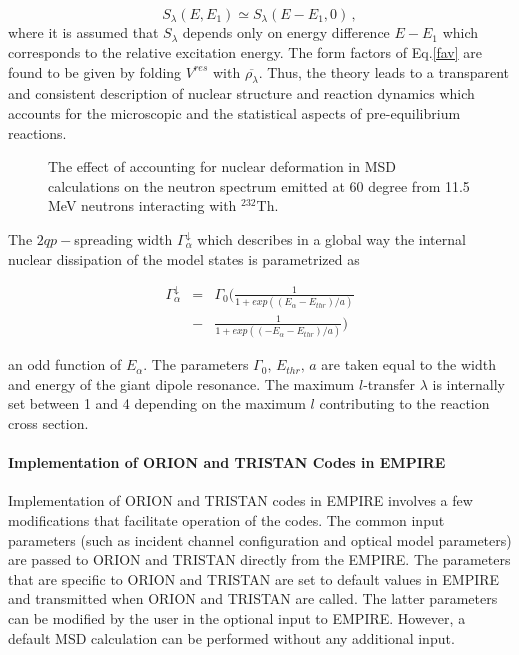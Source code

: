 \documentclass[twocolumn,amsmath,amssymb,10pt,groupedaddress,a4paper]{revtex4}
\begin{document}
\begin{equation}
S_{\lambda}(E,E_{1})\simeq S_{\lambda}(E-E_{1},0)\,,\label{slrpa}
\end{equation}
\noindent where it is assumed that $S_{\lambda}$ depends only on energy difference
$E-E_{1}$ which corresponds to the relative excitation energy. The
form factors of Eq.\ref{fav} are found to be given by folding $V^{res}$
with $\overline{\rho_{\lambda}}$. Thus, the theory leads to a transparent
and consistent description of nuclear structure and reaction dynamics
which accounts for the microscopic and the statistical aspects of
pre-equilibrium reactions.


\begin{figure}[htbp]
\caption{The effect of accounting for nuclear deformation in MSD calculations on the neutron spectrum emitted at 60 degree from 11.5 MeV neutrons interacting with $^{232}$Th.}
\label{fig:Th-defMSD}
\end{figure}


The $2qp-$spreading width $\Gamma_{\alpha}^{\downarrow}$ which describes
in a global way the internal nuclear dissipation of the model states
is parametrized as

\begin{eqnarray}
\Gamma_{\alpha}^{\downarrow}&=&\Gamma_{0}(\frac{1}{1+exp((E_{\alpha}-E_{thr})/a)} \nonumber \\ &-&\frac{1}{1+exp((-E_{\alpha}-E_{thr})/a)})
\end{eqnarray}

\noindent an odd function of $E_{\alpha}$. The parameters $\Gamma_{0},\, E_{thr},\, a$
are taken equal to the width and energy of the giant dipole resonance.
The maximum $l$-transfer $\lambda$ is internally set between 1 and
4 depending on the maximum $l$ contributing to the reaction cross
section.


\paragraph{Implementation of ORION and TRISTAN Codes in EMPIRE}

Implementation of ORION and TRISTAN codes in EMPIRE
involves a few modifications that facilitate operation of the codes.
The common input parameters (such as incident channel configuration
and optical model parameters) are passed to ORION and TRISTAN directly
from the EMPIRE. The parameters that are specific to ORION and TRISTAN
are set to default values in EMPIRE and transmitted when ORION and
TRISTAN are called. The latter parameters can be modified by the user
in the optional input to EMPIRE. However, a default MSD
calculation can be performed without any additional input.
\end{document}
